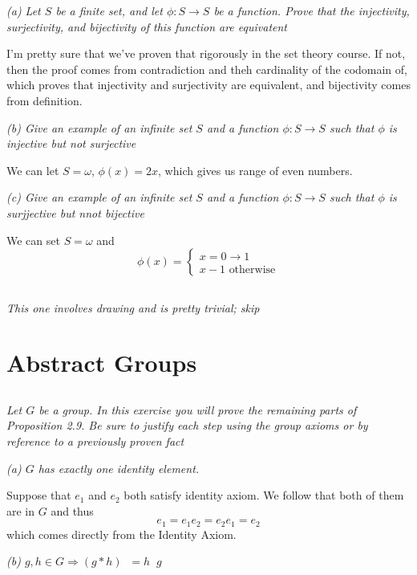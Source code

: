 \documentclass[11pt,oneside,titlepage]{book}
\DeclareMathOperator \inv {^{-1}}
\DeclareMathOperator \ra {\Rightarrow}
\begin{document}
\textit{(a) Let $S$ be a finite set, and let $\phi: S \to S$ be a function. Prove that the
  injectivity, surjectivity, and bijectivity of this function are equivatent}

I'm pretty sure that we've proven that rigorously in the set theory
course. If not, then the proof comes from contradiction and theh
cardinality of the codomain of, which proves that injectivity and
surjectivity are equivalent, and bijectivity comes from definition.

\textit{(b) Give an example of an infinite set $S$ and a function
  $\phi: S \to S$ such that $\phi$ is injective but not surjective}

We can let $S = \omega$, $\phi(x) = 2x$, which gives us range of even numbers.

\textit{(c) Give an example of an infinite set $S$ and a function
  $\phi: S \to S$ such that $\phi$ is surjjective but nnot bijective}

We can set $S = \omega$ and
$$\phi(x) =
\begin{cases}
  x = 0 \to 1 \\
  x - 1 \text{ otherwise}
\end{cases}
$$

\subsection{}

\textit{This one involves drawing and is pretty trivial; skip}

\section{Abstract Groups}


\subsection{}

\textit{Let $G$ be a group. In this exercise you will prove the remaining parts of
  Proposition 2.9. Be sure to justify each step using the group axioms or by reference to a
  previously proven fact}

\textit{(a) $G$ has exactly one identity element.}

Suppose that $e_1$ and $e_2$ both satisfy identity axiom. We follow
that both of them are in $G$ and thus
$$e_1 = e_1 e_2 = e_2 e_1 = e_2$$
which comes directly from the Identity Axiom.

\textit{(b) $g, h \in G \ra (g * h)\inv = h\inv g\inv$}
\end{document}
